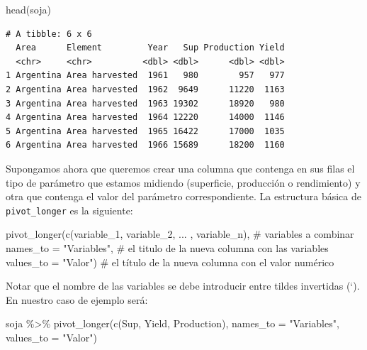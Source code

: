\documentclass[
  letterpaper,
  DIV=11,
  numbers=noendperiod]{scrartcl}
\newenvironment{Shaded}{\begin{snugshade}}{\end{snugshade}}
\newcommand{\AttributeTok}[1]{\textcolor[rgb]{0.40,0.45,0.13}{#1}}
\newcommand{\CommentTok}[1]{\textcolor[rgb]{0.37,0.37,0.37}{#1}}
\newcommand{\FunctionTok}[1]{\textcolor[rgb]{0.28,0.35,0.67}{#1}}
\newcommand{\NormalTok}[1]{\textcolor[rgb]{0.00,0.23,0.31}{#1}}
\newcommand{\SpecialCharTok}[1]{\textcolor[rgb]{0.37,0.37,0.37}{#1}}
\newcommand{\StringTok}[1]{\textcolor[rgb]{0.13,0.47,0.30}{#1}}
\begin{document}
\begin{Shaded}
\begin{Highlighting}[]
\FunctionTok{head}\NormalTok{(soja)}
\end{Highlighting}
\end{Shaded}

\begin{verbatim}
# A tibble: 6 x 6
  Area      Element         Year   Sup Production Yield
  <chr>     <chr>          <dbl> <dbl>      <dbl> <dbl>
1 Argentina Area harvested  1961   980        957   977
2 Argentina Area harvested  1962  9649      11220  1163
3 Argentina Area harvested  1963 19302      18920   980
4 Argentina Area harvested  1964 12220      14000  1146
5 Argentina Area harvested  1965 16422      17000  1035
6 Argentina Area harvested  1966 15689      18200  1160
\end{verbatim}

Supongamos ahora que queremos crear una columna que contenga en sus
filas el tipo de parámetro que estamos midiendo (superficie, producción
o rendimiento) y otra que contenga el valor del parámetro
correspondiente. La estructura básica de \texttt{pivot\_longer} es la
siguiente:

\begin{Shaded}
\begin{Highlighting}[]
\FunctionTok{pivot\_longer}\NormalTok{(}\FunctionTok{c}\NormalTok{(}\StringTok{\textasciigrave{}}\AttributeTok{variable\_1}\StringTok{\textasciigrave{}}\NormalTok{, }\StringTok{\textasciigrave{}}\AttributeTok{variable\_2}\StringTok{\textasciigrave{}}\NormalTok{, ... , }\StringTok{\textasciigrave{}}\AttributeTok{variable\_n}\StringTok{\textasciigrave{}}\NormalTok{), }\CommentTok{\# variables a combinar}
       \AttributeTok{names\_to =} \StringTok{"Variables"}\NormalTok{, }\CommentTok{\# el titulo de la nueva columna con las variables}
       \AttributeTok{values\_to =} \StringTok{"Valor"}\NormalTok{) }\CommentTok{\# el título de la nueva columna con el valor numérico}
\end{Highlighting}
\end{Shaded}

Notar que el nombre de las variables se debe introducir entre tildes
invertidas (`). En nuestro caso de ejemplo será:

\begin{Shaded}
\begin{Highlighting}[]
\NormalTok{soja }\SpecialCharTok{\%\textgreater{}\%} \FunctionTok{pivot\_longer}\NormalTok{(}\FunctionTok{c}\NormalTok{(}\StringTok{\textasciigrave{}}\AttributeTok{Sup}\StringTok{\textasciigrave{}}\NormalTok{, }\StringTok{\textasciigrave{}}\AttributeTok{Yield}\StringTok{\textasciigrave{}}\NormalTok{, }\StringTok{\textasciigrave{}}\AttributeTok{Production}\StringTok{\textasciigrave{}}\NormalTok{),}
       \AttributeTok{names\_to =}  \StringTok{"Variables"}\NormalTok{,}
       \AttributeTok{values\_to =} \StringTok{"Valor"}\NormalTok{)}
\end{Highlighting}
\end{Shaded}
\end{document}

